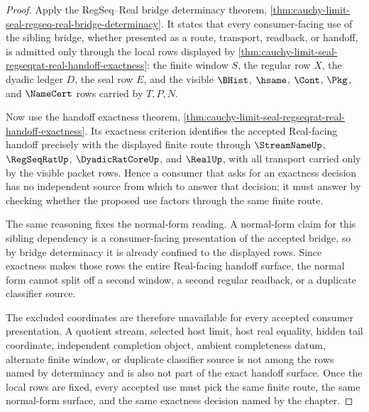 \begin{proof}
Apply the RegSeq--Real bridge determinacy theorem, \autoref{thm:cauchy-limit-seal-regseq-real-bridge-determinacy}. It states that every consumer-facing use of the sibling bridge, whether presented as a route, transport, readback, or handoff, is admitted only through the local rows displayed by \autoref{thm:cauchy-limit-seal-regseqrat-real-handoff-exactness}: the finite window $S$, the regular row $X$, the dyadic ledger $D$, the seal row $E$, and the visible $\BHist$, $\hsame$, $\Cont$, $\Pkg$, and $\NameCert$ rows carried by $T,P,N$.

Now use the handoff exactness theorem, \autoref{thm:cauchy-limit-seal-regseqrat-real-handoff-exactness}. Its exactness criterion identifies the accepted Real-facing handoff precisely with the displayed finite route through $\StreamNameUp$, $\RegSeqRatUp$, $\DyadicRatCoreUp$, and $\RealUp$, with all transport carried only by the visible packet rows. Hence a consumer that asks for an exactness decision has no independent source from which to answer that decision; it must answer by checking whether the proposed use factors through the same finite route.

The same reasoning fixes the normal-form reading. A normal-form claim for this sibling dependency is a consumer-facing presentation of the accepted bridge, so by bridge determinacy it is already confined to the displayed rows. Since exactness makes those rows the entire Real-facing handoff surface, the normal form cannot split off a second window, a second regular readback, or a duplicate classifier source.

The excluded coordinates are therefore unavailable for every accepted consumer presentation. A quotient stream, selected host limit, host real equality, hidden tail coordinate, independent completion object, ambient completeness datum, alternate finite window, or duplicate classifier source is not among the rows named by determinacy and is also not part of the exact handoff surface. Once the local rows are fixed, every accepted use must pick the same finite route, the same normal-form surface, and the same exactness decision named by the chapter.
\end{proof}
